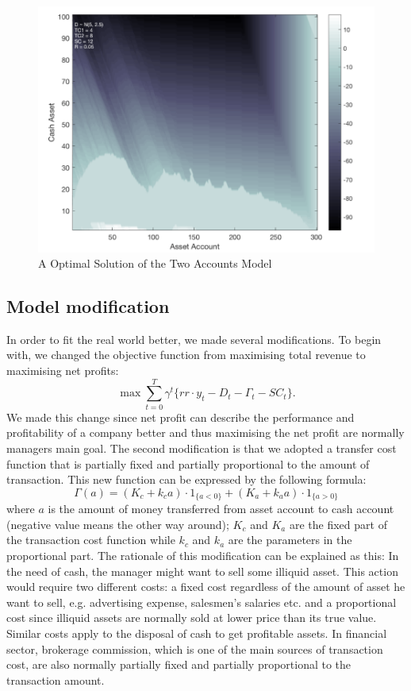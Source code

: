 \documentclass[12pt]{article}
\begin{document}
\begin{figure}
\begin{center}
\includegraphics[scale=.3]{ResultFirstYear_rdy}
\end{center}
\caption{A Optimal Solution of the Two Accounts Model}
\label{firstY}
\end{figure}

\subsection{Model modification}
In order to fit the real world better, we made several modifications. To begin with, we changed the objective function from maximising total revenue to maximising net profits: $$\max \sum^T_{t = 0}\gamma^t  \{ rr \cdot y_t - D_t - \Gamma_t - SC_t \}.$$ We made this change since net profit can describe the performance and profitability of a company better and thus maximising the net profit are normally managers main goal. The second modification is that we adopted a transfer cost function that is partially fixed and partially proportional to the amount of transaction. This new function can be expressed by the following formula: $$\Gamma(a) =  (K_c + k_c a) \cdot 1_{\{ a < 0\}} + (K_a +k_aa)\cdot 1_{\{a>0\}}$$ where $a$ is the amount of money transferred from asset account to cash account (negative value means the other way around); $K_c$ and $K_a$ are the fixed part of the transaction cost function while $k_c$ and $k_a$ are the parameters in the proportional part. The rationale of this modification can be explained as this: In the need of cash, the manager might want to sell some illiquid asset. This action would require two different costs: a fixed cost regardless of the amount of asset he want to sell, e.g. advertising expense, salesmen's salaries etc. and a proportional cost since illiquid assets are normally sold at lower price than its true value. Similar costs apply to the disposal of cash to get profitable assets. In financial sector, brokerage commission, which is one of the main sources of transaction cost, are also normally partially fixed and partially proportional to the transaction amount.
\end{document}
